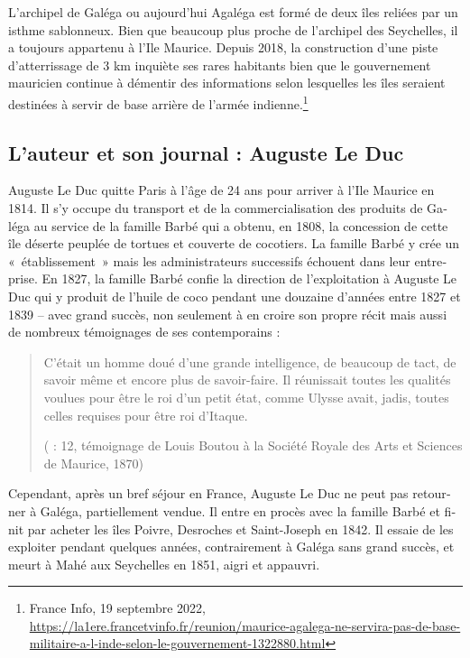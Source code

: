 \documentclass[output=paper]{langscibook}
\begin{document}
\begin{otherlanguage}{french}
L’archipel de Galéga ou aujourd’hui Agaléga est formé de deux îles reliées par un isthme sablonneux. Bien que beaucoup plus proche de l’archipel des Seychelles, il a toujours appartenu à l’Ile Maurice. Depuis 2018, la construction d’une piste d’atterrissage de 3 km inquiète ses rares habitants bien que le gouvernement mauricien continue à démentir des informations selon lesquelles les îles seraient destinées à servir de base arrière de l’armée indienne.\footnote{France Info, 19 septembre 2022, \url{https://la1ere.francetvinfo.fr/reunion/maurice-agalega-ne-servira-pas-de-base-militaire-a-l-inde-selon-le-gouvernement-1322880.html}} 

\subsection{L’auteur et son journal : Auguste Le Duc}\label{sec:kriegel:2.2}

Auguste Le Duc quitte Paris à l’âge de 24 ans pour arriver à l’Ile Maurice en 1814. Il s’y occupe du transport et de la commercialisation des produits de Galéga au service de la famille Barbé qui a obtenu, en 1808, la concession de cette île déserte peuplée de tortues et couverte de cocotiers. La famille Barbé y crée un «~établissement~» mais les administrateurs successifs échouent dans leur entreprise. En 1827, la famille Barbé confie la direction de l’exploitation à Auguste Le Duc qui y produit de l’huile de coco pendant une douzaine d’années entre 1827 et 1839 – avec grand succès, non seulement à en croire son propre récit mais aussi de nombreux témoignages de ses contemporains :

\begin{quote}
 C’était un homme doué d’une grande intelligence, de beaucoup de tact, de savoir même et encore plus de savoir-faire. Il réunissait toutes les qualités voulues pour être le roi d’un petit état, comme Ulysse avait, jadis, toutes celles requises pour être roi d’Itaque.

(\citealt{Pourcelet1994} : 12, témoignage de Louis Boutou à la Société Royale des Arts et Sciences de Maurice, 1870)
\end{quote}

Cependant, après un bref séjour en France, Auguste Le Duc ne peut pas retourner à Galéga, partiellement vendue. Il entre en procès avec la famille Barbé et finit par acheter les îles Poivre, Desroches et Saint-Joseph en 1842. Il essaie de les exploiter pendant quelques années, contrairement à Galéga sans grand succès, et meurt à Mahé aux Seychelles en 1851, aigri et appauvri.


\end{otherlanguage}
\end{document}
